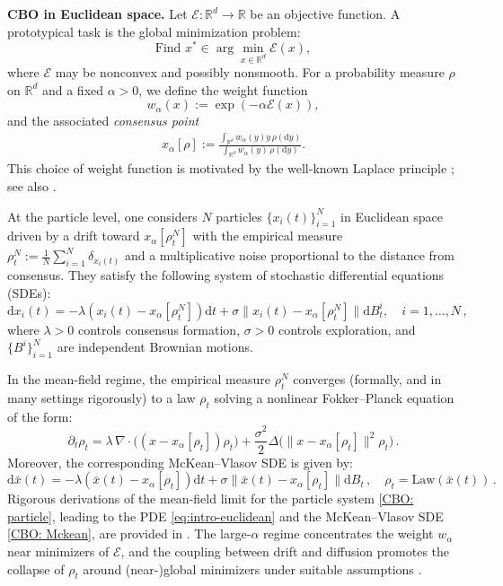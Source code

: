 \documentclass[11pt]{amsart}
\def\d{\mathrm{d}}
\begin{document}
\medskip

\noindent\textbf{CBO in Euclidean space.}
Let $\mathcal{E}:\mathbb{R}^d\to\mathbb{R}$ be an objective function. A prototypical task is the global minimization problem:
\begin{equation*}
\text{Find } x^* \in \arg\min_{x\in\mathbb{R}^d} \mathcal{E}(x),
\end{equation*}
where $\mathcal{E}$ may be nonconvex and possibly nonsmooth. For a probability measure $\rho$ on $\mathbb{R}^d$ and a fixed $\alpha>0$, we define the weight function
\[
w_\alpha(x):=\exp(-\alpha\mathcal{E}(x)),
\]
and the associated \emph{consensus point}
\begin{align}\label{eq: consensus}
x_\alpha[\rho]:=\frac{\int_{\mathbb{R}^d} w_\alpha(y)y\,\rho(\mathrm{d}y)}{\int_{\mathbb{R}^d} w_\alpha(y)\,\rho(\mathrm{d}y)}.
\end{align}
This choice of weight function is motivated by the well-known Laplace principle \cite{MR2571413,miller2006applied}; see also \cite[Appendix A.2]{huang2024consensus}. 

At the particle level, one considers $N$ particles $\{x_i(t)\}_{i=1}^N$ in Euclidean space driven by a drift toward $x_\alpha[\rho_t^N]$ with the empirical measure $\rho_t^N :=\frac{1}{N}\sum_{i=1}^N\delta_{x_i(t)}$ and a multiplicative noise proportional to the distance from consensus. They satisfy the following system of stochastic differential equations (SDEs):
\begin{equation}\label{CBO: particle}
\d x_i(t)=-\lambda(x_i(t)-x_\alpha[\rho_t^N])\d t+\sigma \|x_i(t)-x_\alpha[\rho_t^N]\|\d B_t^{i},\quad i=1,\dots,N\,,
\end{equation}
where $\lambda>0$ controls consensus formation, $\sigma>0$ controls exploration, and $\{B^i\}_{i=1}^N$ are independent Brownian motions.

In the mean-field regime, the empirical measure $\rho_t^N$ converges (formally, and in many settings rigorously) to a law $\rho_t$ solving a nonlinear Fokker--Planck equation of the form:
\begin{equation}\label{eq:intro-euclidean}
\partial_t\rho_t
=
\lambda\,\nabla\cdot\!\big((x-x_\alpha[\rho_t])\rho_t\big)
+\frac{\sigma^2}{2}\Delta\!\big(\|x-x_\alpha[\rho_t]\|^2\rho_t\big)\,.
\end{equation}
Moreover, the corresponding McKean--Vlasov SDE is given by:
\begin{equation}\label{CBO: Mckean}
\d \bar{x}(t)=-\lambda(\bar{x}(t)-x_\alpha[\rho_t])\d t+\sigma \|\bar{x}(t)-x_\alpha[\rho_t]\|\d B_t\,,\quad \rho_t=\mbox{Law}(\bar{x}(t))\,.
\end{equation}
Rigorous derivations of the mean-field limit for the particle system \eqref{CBO: particle}, leading to the PDE  \eqref{eq:intro-euclidean} and the McKean--Vlasov SDE \eqref{CBO: Mckean}, are provided in \cite{bolley2011stochastic,gerber2023mean,huang2025uniform,huang2022mean}. The large-$\alpha$ regime concentrates the weight $w_\alpha$ near minimizers of $\mathcal{E}$, and the coupling between drift and diffusion promotes the collapse of $\rho_t$ around (near-)global minimizers under suitable assumptions \cite{byeon2025consensus,carrillo2018analytical,fornasier2024consensus}.
\end{document}
